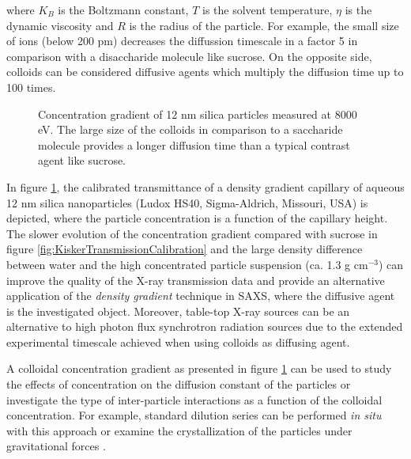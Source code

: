 where $K_B$ is the Boltzmann constant, $T$ is the solvent temperature, $\eta$ is the dynamic viscosity and $R$ is the radius of the particle. For example, the small size of ions (below 200 pm) decreases the diffussion timescale in a factor 5 in comparison with a disaccharide molecule like sucrose. On the opposite side, colloids can be considered diffusive agents which multiply the diffusion time up to 100 times. 

\begin{figure}%
	\centering
		
		\caption[Concentration gradient of 12 nm silica particles measured at 8000 eV.]{Concentration gradient of 12 nm silica particles measured at 8000 eV. The large size of the colloids in comparison to a saccharide molecule provides a longer diffusion time than a typical contrast agent like sucrose.}
		\label{fig:LudoxHS40TransmissionCalibration}
\end{figure}

In figure \ref{fig:LudoxHS40TransmissionCalibration}, the calibrated transmittance of a density gradient capillary of aqueous 12 nm silica nanoparticles (Ludox HS40, Sigma-Aldrich, Missouri, USA) is depicted, where the particle concentration is a function of the capillary height. The slower evolution of the concentration gradient compared with sucrose in figure \ref{fig:KiskerTransmissionCalibration} and the large density difference between water and the high concentrated particle suspension (ca. 1.3 g cm$^{-3}$) can improve the quality of the X-ray transmission data and provide an alternative application of the \emph{density gradient} technique in SAXS, where the diffusive agent is the investigated object. Moreover, table-top X-ray sources can be an alternative to high photon flux synchrotron radiation sources due to the extended experimental timescale achieved when using colloids as diffusing agent.

A colloidal concentration gradient as presented in figure \ref{fig:LudoxHS40TransmissionCalibration} can be used to study the effects of concentration on the diffusion constant of the particles or investigate the type of inter-particle interactions as a function of the colloidal concentration. For example, standard dilution series can be performed \emph{in situ} with this approach or examine the crystallization of the particles under gravitational forces \citep{hellsing_structure_2012}. 
